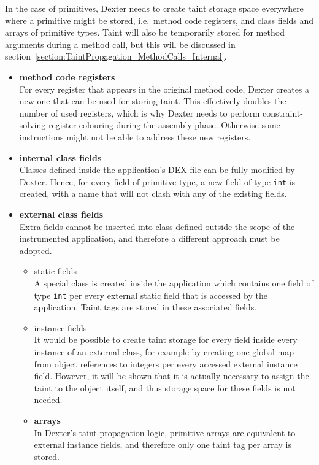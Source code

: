 \documentclass[12pt,twoside,notitlepage]{report}
\begin{document}
\label{section:TaintStorage_Primitives}

In the case of primitives, Dexter needs to create taint storage space everywhere where a primitive might be stored, i.e.\ method code registers, and class fields and arrays of primitive types. Taint will also be temporarily stored for method arguments during a method call, but this will be discussed in section~\ref{section:TaintPropagation_MethodCalls_Internal}.

\begin{itemize}

\item \textbf{method code registers} \\
For every register that appears in the original method code, Dexter creates a new one that can be used for storing taint. This effectively doubles the number of used registers, which is why Dexter needs to perform constraint-solving register colouring during the assembly phase. Otherwise some instructions might not be able to address these new registers.

\item \textbf{internal class fields} \\
Classes defined inside the application's DEX file can be fully modified by Dexter. Hence, for every field of primitive type, a new field of type \verb$int$ is created, with a name that will not clash with any of the existing fields.

\item \textbf{external class fields} \\
Extra fields cannot be inserted into class defined outside the scope of the instrumented application, and therefore a different approach must be adopted. 
\begin{itemize}
\item static fields \\
A special class is created inside the application which contains one field of type \verb$int$ per every external static field that is accessed by the application. Taint tags are stored in these associated fields.

\item instance fields \\
It would be possible to create taint storage for every field inside every instance of an external class, for example by creating one global map from object references to integers per every accessed external instance field. However, it will be shown that it is actually necessary to assign the taint to the object itself, and thus storage space for these fields is not needed.

\item \textbf{arrays} \\
In Dexter's taint propagation logic, primitive arrays are equivalent to external instance fields, and therefore only one taint tag per array is stored.

\end{itemize}

\end{itemize}
\end{document}
